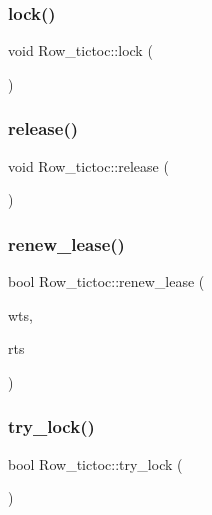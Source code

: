 \subsubsection{\texorpdfstring{lock()}{lock()}}
{\footnotesize\ttfamily void Row\+\_\+tictoc\+::lock (\begin{DoxyParamCaption}{ }\end{DoxyParamCaption})}

\mbox{\label{classRow__tictoc_a0a67be119cc8f17c09c14b4a0294ba73}} 
\subsubsection{\texorpdfstring{release()}{release()}}
{\footnotesize\ttfamily void Row\+\_\+tictoc\+::release (\begin{DoxyParamCaption}{ }\end{DoxyParamCaption})}

\mbox{\label{classRow__tictoc_a49259f37a6c3ab9f74fe861b7f4ba8f6}} 
\subsubsection{\texorpdfstring{renew\+\_\+lease()}{renew\_lease()}}
{\footnotesize\ttfamily bool Row\+\_\+tictoc\+::renew\+\_\+lease (\begin{DoxyParamCaption}\item[{\hyperlink{global_8h_aaf095dfc9b10f757c968fe146ad7e724}{ts\+\_\+t}}]{wts,  }\item[{\hyperlink{global_8h_aaf095dfc9b10f757c968fe146ad7e724}{ts\+\_\+t}}]{rts }\end{DoxyParamCaption})}

\mbox{\label{classRow__tictoc_a726f11ccc49c55ff64160a8c638bedad}} 
\subsubsection{\texorpdfstring{try\+\_\+lock()}{try\_lock()}}
{\footnotesize\ttfamily bool Row\+\_\+tictoc\+::try\+\_\+lock (\begin{DoxyParamCaption}{ }\end{DoxyParamCaption})}

